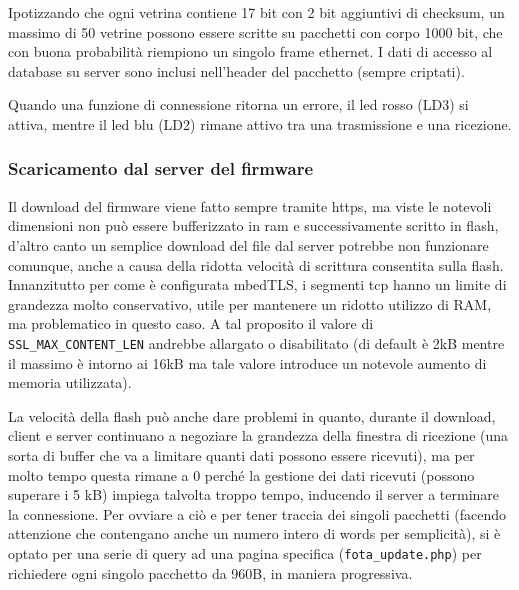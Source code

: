 Ipotizzando che ogni vetrina contiene 17 bit con 2 bit aggiuntivi di checksum, un massimo di 50 vetrine possono essere scritte su pacchetti con corpo 1000 bit, che con buona probabilit\`a riempiono un singolo frame ethernet. I dati di accesso al database su server sono inclusi nell'header del pacchetto (sempre criptati).

Quando una funzione di connessione ritorna un errore, il led rosso (LD3) si attiva, mentre il led blu (LD2) rimane attivo tra una trasmissione e una ricezione.

\subsubsection{Scaricamento dal server del firmware}

Il download del firmware viene fatto sempre tramite https, ma viste le notevoli dimensioni non pu\`o essere bufferizzato in ram e successivamente scritto in flash, d'altro canto un semplice download del file dal server potrebbe non funzionare comunque, anche a causa della ridotta velocit\`a di scrittura consentita sulla flash. Innanzitutto per come \`e configurata mbedTLS, i segmenti tcp hanno un limite di grandezza molto conservativo, utile per mantenere un ridotto utilizzo di RAM, ma problematico in questo caso. A tal proposito il valore di \texttt{SSL\_MAX\_CONTENT\_LEN} andrebbe allargato o disabilitato (di default \`e 2kB mentre il massimo \`e intorno ai 16kB ma tale valore introduce un notevole aumento di memoria utilizzata). 

La velocit\`a della flash pu\`o anche dare problemi in quanto, durante il download, client e server continuano a negoziare la grandezza della finestra di ricezione (una sorta di buffer che va a limitare quanti dati possono essere ricevuti), ma per molto tempo questa rimane a 0 perch\'e la gestione dei dati ricevuti (possono superare i 5 kB) impiega talvolta troppo tempo, inducendo il server a terminare la connessione. Per ovviare a ci\`o e per tener traccia dei singoli pacchetti (facendo attenzione che contengano anche un numero intero di words per semplicit\`a), si \`e optato per una serie di query ad una pagina specifica (\texttt{fota\_update.php}) per richiedere ogni singolo pacchetto da 960B, in maniera progressiva.

